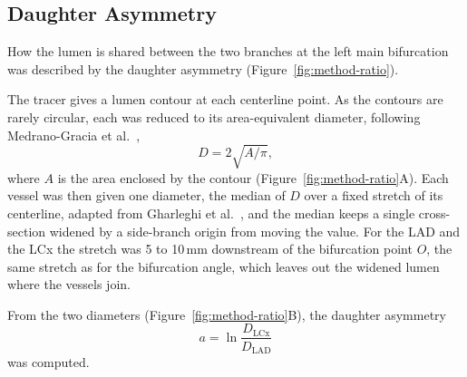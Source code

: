 \subsection{Daughter Asymmetry}
\label{sec:method-ratio}

How the lumen is shared between the two branches at the left main bifurcation was described by the daughter asymmetry (Figure~\ref{fig:method-ratio}).

The tracer gives a lumen contour at each centerline point.
As the contours are rarely circular, each was reduced to its area-equivalent diameter, following Medrano-Gracia et al.\ \cite{medranogracia2016atlas},
\begin{equation}
  D = 2 \sqrt{A / \pi} ,
  \label{eq:method-diameter}
\end{equation}
where $A$ is the area enclosed by the contour (Figure~\ref{fig:method-ratio}A).
Each vessel was then given one diameter, the median of $D$ over a fixed stretch of its centerline, adapted from Gharleghi et al.\ \cite{gharleghi2025sex}, and the median keeps a single cross-section widened by a side-branch origin from moving the value.
For the LAD and the LCx the stretch was 5 to 10\,mm downstream of the bifurcation point $O$, the same stretch as for the bifurcation angle, which leaves out the widened lumen where the vessels join.

From the two diameters (Figure~\ref{fig:method-ratio}B), the daughter asymmetry
\begin{equation}
  a = \ln \frac{D_{\mathrm{LCx}}}{D_{\mathrm{LAD}}}
  \label{eq:method-asymmetry}
\end{equation}
was computed.

